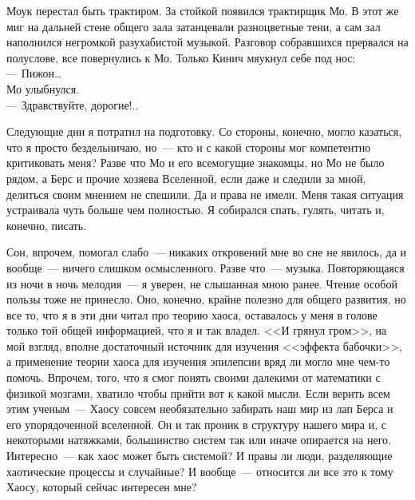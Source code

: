 Моук перестал быть трактиром. За стойкой появился трактирщик Мо. В этот же миг 
на дальней стене общего зала затанцевали разноцветные тени, а сам зал 
наполнился негромкой разухабистой музыкой. Разговор собравшихся прервался на полуслове, 
все повернулись к Мо. Только Кинич мяукнул себе под нос:\\
--- Пижон\ldots\\
Мо улыбнулся.\\
--- Здравствуйте, дорогие!..

\newpage


Следующие дни я потратил на подготовку. Со стороны, конечно, могло казаться, 
что я просто бездельничаю, но~--- кто и с какой стороны мог компетентно критиковать 
меня? Разве что Мо и его всемогущие знакомцы, но Мо не было рядом, а Берс и 
прочие хозяева Вселенной, если даже и следили за мной, делиться своим мнением 
не спешили. Да и права не имели. Меня такая ситуация устраивала чуть больше чем 
полностью. Я собирался спать, гулять, читать и, конечно, писать.

Сон, впрочем, помогал слабо~--- никаких откровений мне во сне не явилось, да и 
вообще~--- ничего слишком осмысленного. Разве что~--- музыка. Повторяющаяся из 
ночи в ночь мелодия~--- я уверен, не слышанная мною ранее. Чтение особой пользы тоже 
не принесло. Оно, конечно, крайне полезно для общего развития, но все то, что я в 
эти дни читал про теорию хаоса, оставалось у меня в голове только той общей 
информацией, что я и так владел. <<И грянул гром>>, на мой взгляд, вполне 
достаточный источник для изучения <<эффекта бабочки>>, а применение теории 
хаоса для изучения эпилепсии вряд ли могло мне чем-то помочь. Впрочем, того, что я 
смог понять своими далекими от математики с физикой мозгами, хватило чтобы 
прийти вот к какой мысли. Если верить всем этим ученым~--- Хаосу совсем 
необязательно забирать наш мир из лап Берса и его упорядоченной вселенной. Он и 
так проник в структуру нашего мира и, с некоторыми натяжками, большинство 
систем так или иначе опирается на него. Интересно~--- как хаос может быть системой? И 
правы ли люди, разделяющие хаотические процессы и случайные? И вообще~--- 
относится ли все это к тому Хаосу, который сейчас интересен мне?

